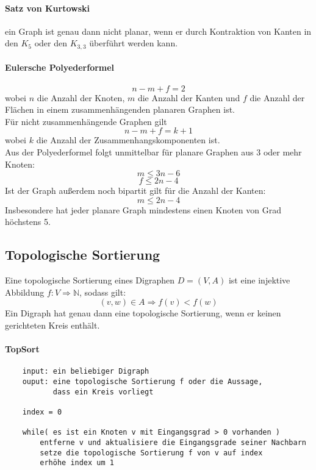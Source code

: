 \documentclass[10pt,a4paper,landscape]{article}
\begin{document}
\begin{multicols*}{2}
            \paragraph*{ Satz von Kurtowski } ein Graph ist genau dann nicht planar, wenn er durch Kontraktion von Kanten 
            in den $K_5$ oder den $K_{3,3}$ überführt werden kann.
            \paragraph*{ Eulersche Polyederformel }
            \[ n - m + f = 2 \]
            wobei $n$ die Anzahl der Knoten, $m$ die Anzahl der Kanten und $f$ die Anzahl der Flächen in einem 
            zusammenhängenden planaren Graphen ist. \\
            Für nicht zusammenhängende Graphen gilt
            \[ n - m + f = k + 1 \]
            wobei $k$ die Anzahl der Zusammenhangskomponenten ist. \\
            Aus der Polyederformel folgt unmittelbar für planare Graphen aus 3 oder mehr Knoten:
            \[ m \leq 3n - 6 \]
            \[ f \leq 2n - 4 \]
            Ist der Graph außerdem noch bipartit gilt für die Anzahl der Kanten:
            \[ m \leq 2n - 4 \]
            Insbesondere hat jeder planare Graph mindestens einen Knoten von Grad höchstens 5.

            \subsection{ Topologische Sortierung }
            Eine topologische Sortierung eines Digraphen $D = (V,A)$ ist eine injektive Abbildung 
            $f:V\Rightarrow \mathbb{N}$, sodass gilt:
            \[ (v,w)\in A \Rightarrow f(v) < f(w) \]
            Ein Digraph hat genau dann eine topologische Sortierung, wenn er keinen gerichteten Kreis enthält.
            \newpage
            \paragraph*{ TopSort }
            \begin{verbatim}
    input: ein beliebiger Digraph
    ouput: eine topologische Sortierung f oder die Aussage, 
           dass ein Kreis vorliegt

    index = 0

    while( es ist ein Knoten v mit Eingangsgrad > 0 vorhanden )
        entferne v und aktualisiere die Eingangsgrade seiner Nachbarn
        setze die topologische Sortierung f von v auf index
        erhöhe index um 1


\end{verbatim}
\end{multicols*}
\end{document}
